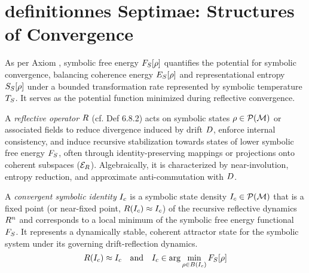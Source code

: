 \section{definitionnes Septimae: Structures of Convergence}
\label{sec:bk7_definitionnes_septimae_structures_of_convergence}
\begin{definition}
\label{definition:bk7_symbolic_free_energy}
As per Axiom , symbolic free energy \(F_S[\rho]\) quantifies the potential for symbolic convergence, balancing coherence energy \(E_S[\rho]\) and representational entropy \(S_S[\rho]\) under a bounded transformation rate represented by symbolic temperature \(T_S\). It serves as the potential function minimized during reflective convergence.
\end{definition}
\begin{definition}
\label{definition:bk7_reflective_operator}
A \emph{reflective operator} \(R\) (cf. Def 6.8.2) acts on symbolic states \(\rho \in \mathcal{P}(\mathcal{M})\) or associated fields to reduce divergence induced by drift \(D\), enforce internal consistency, and induce recursive stabilization towards states of lower symbolic free energy \(F_S\), often through identity-preserving mappings or projections onto coherent subspaces (\(\mathcal{E}_R\)). Algebraically, it is characterized by near-involution, entropy reduction, and approximate anti-commutation with \(D\).
\end{definition}
\begin{definition}
\label{definition:bk7_convergent_symbolic_identity}
A \emph{convergent symbolic identity} \(I_c\) is a symbolic state density \(I_c \in \mathcal{P}(\mathcal{M})\) that is a fixed point (or near-fixed point, \(R(I_c) \approx I_c\)) of the recursive reflective dynamics \(R^n\) and corresponds to a local minimum of the symbolic free energy functional \(F_S\). It represents a dynamically stable, coherent attractor state for the symbolic system under its governing drift-reflection dynamics.
\[
R(I_c) \approx I_c \quad \text{and} \quad I_c \in \arg\min_{\rho \in B(I_c)} F_S[\rho]
\]
\end{definition}
